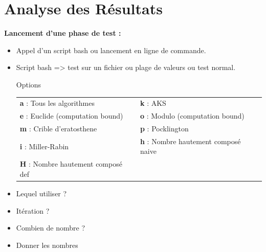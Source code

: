 	\section{Analyse des Résultats}
		\begin{frame}
		\textbf{Lancement d'une phase de test :}

	\begin{itemize}
		\item Appel d'un script bash ou lancement en ligne de commande.\\
		\item Script bash => test sur un fichier ou plage de valeurs ou test normal.
		\begin{block}{Options}\vspace{-1em}
	\begin{center}\footnotesize\begin{longtable}{l l}		
	\textbf{a} : Tous les algorithmes  & \textbf{k} : AKS\\
	\textbf{e} : Euclide (computation bound) & \textbf{o} : Modulo (computation bound)\\
	\textbf{m} : Crible d'eratosthene & \textbf{p} : Pocklington\\
	\textbf{i} : Miller-Rabin & \textbf{h} : Nombre hautement composé naive\\
	\textbf{H} : Nombre hautement composé def\\
	\end{longtable}\end{center}
	\end{block}
		\item Lequel utiliser ?\\
		\item Itération ?\\
		\item Combien de nombre ?\\
		\item Donner les nombres\\
	\end{itemize}
\end{frame}

